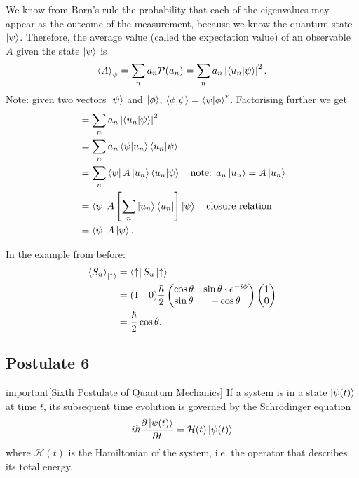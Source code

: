 \documentclass{article}
\begin{document}
We know from Born's rule the probability that each of the eigenvalues may appear as the outcome of the measurement, because we know the quantum state $\ket{\psi }$. Therefore, the average value (called the expectation value) of an observable $A$ given the state $\ket{\psi }$ is
\[
    \left\langle A \right\rangle _\psi =\sum_{n}a_n \mathcal{P}(a_n)=\sum_{n}a_n \left| \braket{u_n}{\psi } \right|^2. 
\]
Note: given two vectors $\ket{\psi }$ and $\ket{\phi }$, $\braket{\phi }{\psi }=\braket{\psi }{\phi }^*$. Factorising further we get
\begin{align*}
     &= \sum_{n}a_n \left| \braket{u_n}{\psi } \right|^2 \\
     &=\sum_{n}a_n \braket{\psi }{u_n}\braket{u_n}{\psi } \\
     &=\sum_{n}\bra{\psi }A \ket{u_n}\braket{u_n}{\psi } \quad \text{note: }a_n \ket{u_n}=A \ket{u_n} \\
     &= \bra{\psi }A \left[ \sum_{n}\ket{u_n}\bra{u_n} \right]\ket{\psi } \quad \text{closure relation}\\
     &=\bra{\psi }A \ket{\psi }.
\end{align*}

In the example from before:
\begin{align*}
    \left\langle S_u \right\rangle _{\ket{\uparrow}} &= \bra{\uparrow}S_u \ket{\uparrow} \\
                                                     &= (1\quad 0)\frac{\hbar}{2}\begin{pmatrix}
                                                         \cos\theta & \sin\theta \cdot e^{-i\phi } \\
                                                         \sin\theta & -\cos\theta 
                                                     \end{pmatrix}\begin{pmatrix}
                                                         1 \\ 0
                                                     \end{pmatrix} \\
                                                     &= \frac{\hbar}{2}\cos\theta .
\end{align*}

\subsection{Postulate 6}
\begin{callout*}{important}[Sixth Postulate of Quantum Mechanics]
\label{important:s3-p6}
    If a system is in a state $\ket{\psi (t)}$ at time $t$, its subsequent time evolution is governed by the Schr\"odinger equation
    \[
        i \hbar \frac{\partial \ket{\psi (t)}}{\partial t}=\mathcal{H}(t) \ket{\psi (t)}
    \]
    where $\mathcal{H}(t)$ is the Hamiltonian of the system, i.e. the operator that describes its total energy.
\end{callout*}
\end{document}
